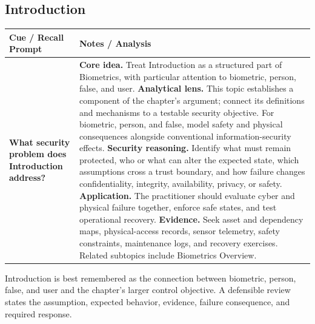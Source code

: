 \documentclass[11pt]{article}
\newcommand{\CornellHeader}{%
\rowcolor{Navy}\color{white}\bfseries Cue / Recall Prompt & \color{white}\bfseries Notes / Analysis\\\hline}
\newcommand{\CornellRow}[2]{%
\cellcolor{CueGray}\RaggedRight\textbf{#1} & \RaggedRight #2\\\hline}
\begin{document}
\subsection*{Introduction}
\begin{longtable}{>{\RaggedRight\arraybackslash}p{}|>{\RaggedRight\arraybackslash}p{}}
\CornellHeader
\CornellRow{What security problem does Introduction address?}{\textbf{Core idea.} Treat Introduction as a structured part of Biometrics, with particular attention to biometric, person, false, and user. \textbf{Analytical lens.} This topic establishes a component of the chapter's argument; connect its definitions and mechanisms to a testable security objective. For biometric, person, and false, model safety and physical consequences alongside conventional information-security effects. \textbf{Security reasoning.} Identify what must remain protected, who or what can alter the expected state, which assumptions cross a trust boundary, and how failure changes confidentiality, integrity, availability, privacy, or safety. \textbf{Application.} The practitioner should evaluate cyber and physical failure together, enforce safe states, and test operational recovery. \textbf{Evidence.} Seek asset and dependency maps, physical-access records, sensor telemetry, safety constraints, maintenance logs, and recovery exercises. Related subtopics include Biometrics Overview.}
\end{longtable}
\begin{topicsummary}
Introduction is best remembered as the connection between biometric, person, false, and user and the chapter's larger control objective. A defensible review states the assumption, expected behavior, evidence, failure consequence, and required response.
\end{topicsummary}
\end{document}
